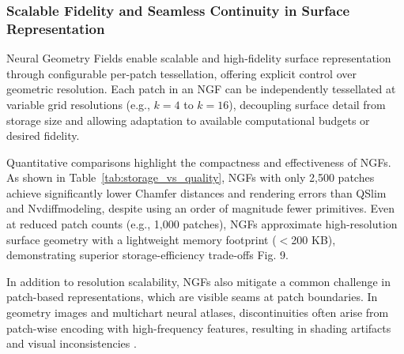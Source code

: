 \subsubsection{Scalable Fidelity and Seamless Continuity in Surface Representation}

Neural Geometry Fields enable scalable and high-fidelity surface representation through configurable per-patch tessellation, offering explicit control over geometric resolution. 
Each patch in an NGF can be independently tessellated at variable grid resolutions (e.g., $k=4$ to $k=16$), decoupling surface detail from storage size and allowing adaptation to available computational budgets or desired fidelity. 

Quantitative comparisons highlight the compactness and effectiveness of NGFs. 
As shown in Table~\ref{tab:storage_vs_quality}, NGFs with only 2,500 patches achieve significantly lower Chamfer distances and rendering errors than QSlim and Nvdiffmodeling, despite using an order of magnitude fewer primitives. 
Even at reduced patch counts (e.g., 1,000 patches), NGFs approximate high-resolution surface geometry with a lightweight memory footprint ($<$200 KB), demonstrating superior storage-efficiency trade-offs \cite{sivaram2024} Fig. 9. 

\begin{table}[h]
\caption{Storage vs. visual quality on the Ganesha model. Inspired by \cite{sivaram2024}, Table 2 and Fig. 7.}
\centering
{}
\label{tab:storage_vs_quality}
\end{table}

In addition to resolution scalability, NGFs also mitigate a common challenge in patch-based representations, which are visible seams at patch boundaries. 
In geometry images and multichart neural atlases, discontinuities often arise from patch-wise encoding with high-frequency features, resulting in shading artifacts and visual inconsistencies \cite{Gu2002}. 

